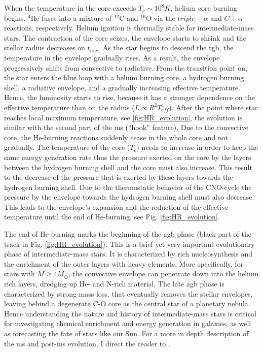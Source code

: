 When the temperature in the core exceeds $T_c \sim 10^8 K$, helium core burning begins. $^4$He fuses into a mixture of $^{12}$C and $^{16
}$O via the $triple- \alpha$ and $C+\alpha$ reactions, respectively. Helium ignition is thermally stable for intermediate-mass stars. The contraction of the core seizes, the envelope starts to shrink and the stellar radius decreases on $t_{nuc}$. As the star begins to descend the \ac{rgb}, the temperature in the envelope gradually rises. As a result, the envelope progressively shifts from convective to radiative. From the transition point on, the star enters the blue loop with a helium burning core, a hydrogen burning shell, a radiative envelope, and a gradually increasing effective temperature.  Hence, the luminosity starts to rise, because it has a stronger dependence on the effective temperature than on the radius ($L \propto R^2 T_{eff}^4$). After the point where star reaches local maximum temperature, see \cref{fig:HR_evolution}, the evolution is similar with the second part of the \ac{ms} (``hook'' feature). Due to the convective core, the He-burning reactions suddenly cease in the whole core and not gradually. The temperature of the core ($T_c$) needs to increase in order to keep the same energy generation rate thus the pressure exerted on the core by the layers between the hydrogen burning shell and the core must also increase. This result to the decrease of the pressure that is exerted by these layers towards the hydrogen burning shell. Due to the thermostatic behavior of the CNO-cycle the pressure by the envelope towards the hydrogen burning shell must also decrease. This leads to the envelope's expansion and the reduction of the effective temperature until the end of He-burning, see Fig. \ref{fig:HR_evolution}.

The end of He-burning marks the beginning of the \ac{agb} phase (black part of the track in Fig. \ref{fig:HR_evolution}). This is a brief yet very important evolutionary phase of intermediate-mass stars. It is characterized by rich nucleosynthesis and the enrichment of the outer layers with heavy elements. More specifically, for stars with $M \geq 4M_{\odot}$, the convective envelope can penetrate down into the helium rich layers, dredging up He- and N-rich material. The late \ac{agb} phase is characterized by strong mass loss, that eventually removes the stellar envelopes, leaving behind a degenerate C-O core as the central star of a planetary nebula\citep{pols2011stellar}. Hence understanding the nature and history of intermediate-mass stars is critical for investigating chemical enrichment and energy generation in galaxies, as well as forecasting the fate of stars like our Sun. For a more in depth description of the \ac{ms} and post-\ac{ms} evolution, I direct the reader to \cite{pols2011stellar}.


